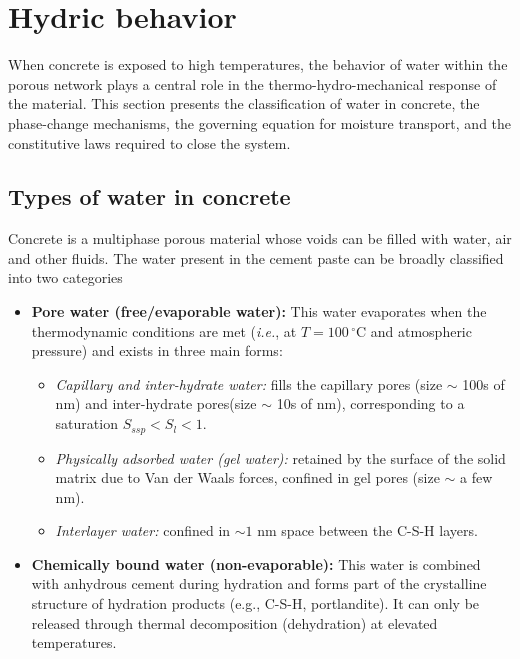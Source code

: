 \section{Hydric behavior}

When concrete is exposed to high temperatures, the behavior of water within the porous network plays a central role in the thermo-hydro-mechanical response of the material. This section presents the classification of water in concrete, the phase-change mechanisms, the governing equation for moisture transport, and the constitutive laws required to close the system.

\subsection{Types of water in concrete}

Concrete is a multiphase porous material whose voids can be filled with water, air and other fluids. The water present in the cement paste can be broadly classified into two categories \cite{dauti2018}

\begin{itemize}
    \item \textbf{Pore water (free/evaporable water):} 
    This water evaporates when the thermodynamic conditions are met (\textit{i.e.}, at $T = 100\,^\circ$C and atmospheric pressure) and exists in three main forms:
    \begin{itemize}
        \item \textit{Capillary and inter-hydrate water:} fills the capillary pores (size $\sim$ 100s of nm) and inter-hydrate pores(size $\sim$ 10s of nm), corresponding to a saturation $S_{ssp} < S_l < 1$. 
        \item \textit{Physically adsorbed water (gel water):} retained by the surface of the solid matrix due to Van der Waals forces, confined in gel pores (size $\sim$ a few nm). 
        \item \textit{Interlayer water:} confined in $\sim 1$ nm space between the C-S-H layers.
    \end{itemize}
    
    \item \textbf{Chemically bound water (non-evaporable):} 
    This water is combined with anhydrous cement during hydration and forms part of the crystalline structure of hydration products (e.g., C-S-H, portlandite). It can only be released through thermal decomposition (dehydration) at elevated temperatures.
\end{itemize}


